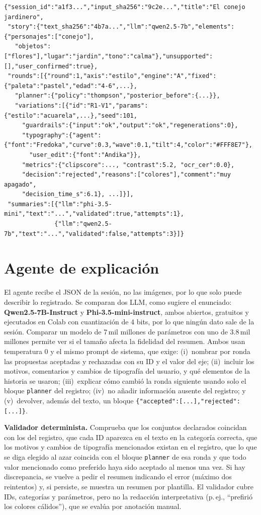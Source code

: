 \documentclass[10pt,a4paper,twocolumn]{article}
\begin{document}
\begin{lstlisting}
{"session_id":"a1f3...","input_sha256":"9c2e...","title":"El conejo jardinero",
 "story":{"text_sha256":"4b7a...","llm":"qwen2.5-7b","elements":{"personajes":["conejo"],
   "objetos":["flores"],"lugar":"jardin","tono":"calma"},"unsupported":[],"user_confirmed":true},
 "rounds":[{"round":1,"axis":"estilo","engine":"A","fixed":{"paleta":"pastel","edad":"4-6",...},
   "planner":{"policy":"thompson","posterior_before":{...}},
   "variations":[{"id":"R1-V1","params":{"estilo":"acuarela",...},"seed":101,
     "guardrails":{"input":"ok","output":"ok","regenerations":0},
     "typography":{"agent":{"font":"Fredoka","curve":0.3,"wave":0.1,"tilt":4,"color":"#FFF8E7"},
       "user_edit":{"font":"Andika"}},
     "metrics":{"clipscore":..., "contrast":5.2, "ocr_cer":0.0},
     "decision":"rejected","reasons":["colores"],"comment":"muy apagado",
     "decision_time_s":6.1}, ...]}],
 "summaries":[{"llm":"phi-3.5-mini","text":"...","validated":true,"attempts":1},
              {"llm":"qwen2.5-7b","text":"...","validated":false,"attempts":3}]}
\end{lstlisting}

\section{Agente de explicación}
El agente recibe el JSON de la sesión, no las imágenes, por lo que solo puede describir lo registrado. Se comparan dos LLM, como sugiere el enunciado: \textbf{Qwen2.5-7B-Instruct} y \textbf{Phi-3.5-mini-instruct}, ambos abiertos, gratuitos y ejecutados en Colab con cuantización de 4 bits, por lo que ningún dato sale de la sesión. Comparar un modelo de 7\,mil millones de parámetros con uno de 3.8\,mil millones permite ver si el tamaño afecta la fidelidad del resumen. Ambos usan temperatura 0 y el mismo prompt de sistema, que exige:
(i)~nombrar por ronda las propuestas aceptadas y rechazadas con su ID y el valor del eje;
(ii)~incluir los motivos, comentarios y cambios de tipografía del usuario, y qué elementos de la historia se usaron;
(iii)~explicar cómo cambió la ronda siguiente usando solo el bloque \texttt{planner} del registro;
(iv)~no añadir información ausente del registro; y
(v)~devolver, además del texto, un bloque \lstinline[basicstyle=\ttfamily\footnotesize]|{"accepted":[...],"rejected":[...]}|.

\textbf{Validador determinista.} Comprueba que los conjuntos declarados coincidan con los del registro, que cada ID aparezca en el texto en la categoría correcta, que los motivos y cambios de tipografía mencionados existan en el registro, que lo que se diga elegido al azar coincida con el bloque \texttt{planner} de esa ronda y que todo valor mencionado como preferido haya sido aceptado al menos una vez. Si hay discrepancia, se vuelve a pedir el resumen indicando el error (máximo dos reintentos) y, si persiste, se muestra un resumen por plantilla. El validador cubre IDs, categorías y parámetros, pero no la redacción interpretativa (p.\,ej., ``prefirió los colores cálidos''), que se evalúa por anotación manual.
\end{document}
